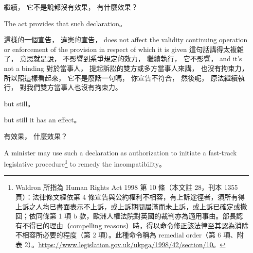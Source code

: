 \hypertarget{w06:cue:832}{}繼續，
\hypertarget{w06:cue:833}{}它不是說都沒有效果，
\hypertarget{w06:cue:834}{}有什麼效果？

\hypertarget{w06:cue:835}{}The act provides that such declaration。

\hypertarget{w06:cue:836}{}這樣的一個宣告，
\hypertarget{w06:cue:837}{}違憲的宣告，
\hypertarget{w06:cue:838}{}does not affect the validity
\hypertarget{w06:cue:839}{}continuing operation
\hypertarget{w06:cue:840}{}or enforcement of the provision
\hypertarget{w06:cue:841}{}in respect of which it is given
\hypertarget{w06:cue:842}{}這句話講得太複雜了，
\hypertarget{w06:cue:843}{}意思就是說，
\hypertarget{w06:cue:844}{}不影響到系爭規定的效力，
\hypertarget{w06:cue:845}{}繼續執行，
\hypertarget{w06:cue:846}{}它不影響，
\hypertarget{w06:cue:847}{}and it's not a binding
\hypertarget{w06:cue:848}{}對於當事人，
\hypertarget{w06:cue:849}{}提起訴訟的雙方或多方當事人來講，
\hypertarget{w06:cue:850}{}也沒有拘束力，
\hypertarget{w06:cue:851}{}所以照這樣看起來，
\hypertarget{w06:cue:852}{}它不是廢話一句嗎，
\hypertarget{w06:cue:853}{}你宣告不符合，
\hypertarget{w06:cue:854}{}然後呢，
\hypertarget{w06:cue:855}{}原法繼續執行，
\hypertarget{w06:cue:856}{}對我們雙方當事人也沒有拘束力。

\hypertarget{w06:cue:857}{}but still。

\hypertarget{w06:cue:858}{}but still it has an effect。

\hypertarget{w06:cue:859}{}有效果，
\hypertarget{w06:cue:860}{}什麼效果？

\hypertarget{w06:cue:861}{}A minister may use such a declaration as authorization to initiate a fast-track legislative procedure\footnote{Waldron 所指為 Human Rights Act 1998 第 10 條（本文註 28，刊本 1355 頁）：法律條文經依第 4 條宣告與公約權利不相容，有上訴途徑者，須所有得上訴之人均已書面表示不上訴，或上訴期間屆滿而未上訴，或上訴已確定或撤回；依同條第 1 項 b 款，歐洲人權法院對英國的裁判亦為適用事由。部長認有不得已的理由（compelling reasons）時，得以命令修正該法律至其認為消除不相容所必要的程度（第 2 項）。此種命令稱為 remedial order（第 6 項、附表 2）。\url{https://www.legislation.gov.uk/ukpga/1998/42/section/10}。} to remedy the incompatibility。

